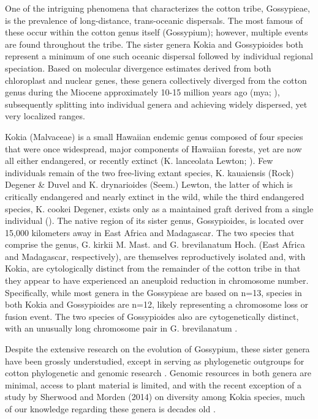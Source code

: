 \documentclass[10pt,letterpaper]{article}
\begin{document}
One of the intriguing phenomena that characterizes the cotton tribe, Gossypieae,
is the prevalence of long-distance, trans-oceanic dispersals. The most famous of
these occur within the cotton genus itself (Gossypium); however, multiple events
are found throughout the tribe\cite{Dejoode1992, Fryxell1979, Stephens1958,
  Stephens1966, Wendel1989, Wendel1992, Wendel1990, Wendel1990b, Wendel2003,
  Seelanan1997}. The sister genera Kokia and Gossypioides both represent a
minimum of one such oceanic dispersal followed by individual regional
speciation. Based on molecular divergence estimates derived from both
chloroplast and nuclear genes, these genera collectively diverged from the
cotton genus during the Miocene approximately 10-15 million years ago (mya;
\cite{Seelanan1997, Cronn2002}), subsequently splitting into individual genera
and achieving widely dispersed, yet very localized ranges.

Kokia (Malvaceae) is a small Hawaiian endemic genus composed of four species
that were once widespread, major components of Hawaiian forests, yet are now all
either endangered, or recently extinct (K. lanceolata Lewton; \cite{Bates1990,
  Sherwood2014}). Few individuals remain of the two free-living extant species,
K. kauaiensis (Rock) Degener \& Duvel and K. drynarioides (Seem.) Lewton, the
latter of which is critically endangered and nearly extinct in the wild, while
the third endangered species, K. cookei Degener, exists only as a maintained
graft derived from a single individual (\cite{Service2012, Sherwood2014}). The
native region of its sister genus, Gossypioides, is located over 15,000
kilometers away in East Africa and Madagascar. The two species that comprise the
genus, G. kirkii M. Mast. and G. brevilanatum Hoch. (East Africa and Madagascar,
respectively), are themselves reproductively isolated and, with Kokia, are
cytologically distinct from the remainder of the cotton tribe in that they
appear to have experienced an aneuploid reduction in chromosome number.
Specifically, while most genera in the Gossypieae are based on n=13, species in
both Kokia and Gossypioides are n=12, likely representing a chromosome loss or
fusion event. The two species of Gossypioides also are cytogenetically distinct,
with an unusually long chromosome pair in G. brevilanatum \cite{Hutchinson1937,
  Hutchinson1943}.

Despite the extensive research on the evolution of Gossypium, these sister
genera have been grossly understudied, except in serving as phylogenetic
outgroups for cotton phylogenetic and genomic research \cite{Seelanan1997,
  Cronn2002}. Genomic resources in both genera are minimal, access to plant
material is limited, and with the recent exception of a study by Sherwood and
Morden (2014) on diversity among Kokia species, much of our knowledge regarding
these genera is decades old \cite{Hutchinson1947, Seelanan1997, Fryxell1968}.
\end{document}
